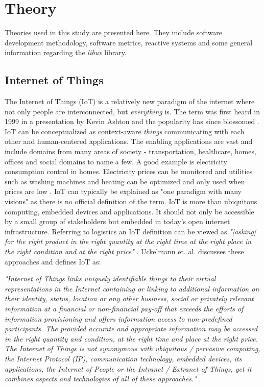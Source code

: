 \chapter{Theory}
\label{cha:theory}

Theories used in this study are presented here. They include software
development methodology, software metrics, reactive systems and some general
information regarding the \textit{libuv} library.

\section{Internet of Things}

The Internet of Things (IoT) is a relatively new paradigm of the internet where
not only people are interconnected, but \textit{everything} is. The term was
first heard in 1999 in a presentation by Kevin Ashton \cite{ashton2011internet}
and the popularity has since blossomed \cite{gubbi2013internet}. IoT can be
conceptualized as context-aware \textit{things} communicating with each other
and human-centered applications. The enabling applications are vast and include
domains from many areas of society - transportation, healthcare, homes, offices
and social domains to name a few. A good example is electricity consumption
control in homes. Electricity prices can be monitored and utilities such as
washing machines and heating can be optimized and only used when prices are low
\cite{atzori2010internet}. IoT can typically be explained as "one paradigm with
many visions" \cite{atzori2010internet} as there is no official definition of
the term. IoT is more than ubiquitous computing, embedded devices and
applications. It should not only be accessible by a small group of stakeholders
but embedded in today's open internet infrastructure. Referring to logistics an
IoT definition can be viewed as \textit{"[asking] for the right product in the
right quantity at the right time at the right place in the right condition and
at the right price"} \cite{uckelmann2011architectural}. Uckelmann et. al.
discusses these approaches and defines IoT as:

\begin{center}
\textit{"Internet of Things links
uniquely identifiable things to their virtual representations in the Internet
containing or linking to additional information on their identity, status,
location or any other business, social or privately relevant information at a
financial or non-financial pay-off that exceeds the efforts of information
provisioning and offers information access to non-predefined participants. The
provided accurate and appropriate information may be accessed in the right
quantity and condition, at the right time and place at the right price. The
Internet of Things is not synonymous with ubiquitous / pervasive computing, the
Internet Protocol (IP), communication technology, embedded devices, its
applications, the Internet of People or the Intranet / Extranet of Things, yet
it combines aspects and technologies of all of these approaches."}
\cite{uckelmann2011architectural}.
\end{center}

